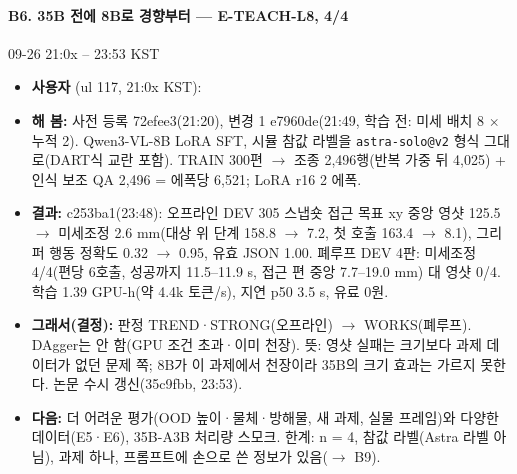 \paragraph{B6. 35B 전에 8B로 경향부터 --- E-TEACH-L8, 4/4}
{\small 09-26 21:0x -- 23:53 KST}
\begin{itemize}
  \item \textbf{사용자} (ul 117, 21:0x KST): 
  \item \textbf{해 봄:} 사전 등록 72efee3(21:20), 변경 1 e7960de(21:49, 학습 전: 미세 배치 8 $\times$ 누적 2). Qwen3-VL-8B LoRA SFT, 시뮬 참값 라벨을 \texttt{astra-\allowbreak{}solo@v2} 형식 그대로(DART식 교란 포함). TRAIN 300편 $\rightarrow$ 조종 2,496행(반복 가중 뒤 4,025) + 인식 보조 QA 2,496 = 에폭당 6,521; LoRA r16 2 에폭.
  \item \textbf{결과:} c253ba1(23:48): 오프라인 DEV 305 스냅숏 접근 목표 xy 중앙 영샷 125.5 $\rightarrow$ 미세조정 2.6 mm(대상 위 단계 158.8 $\rightarrow$ 7.2, 첫 호출 163.4 $\rightarrow$ 8.1), 그리퍼 행동 정확도 0.32 $\rightarrow$ 0.95, 유효 JSON 1.00. 폐루프 DEV 4판: 미세조정 4/4(편당 6호출, 성공까지 11.5--11.9 s, 접근 편 중앙 7.7--19.0 mm) 대 영샷 0/4. 학습 1.39 GPU-h(약 4.4k 토큰/s), 지연 p50 3.5 s, 유료 0원.
  \item \textbf{그래서(결정):} 판정 TREND·STRONG(오프라인) $\rightarrow$ WORKS(폐루프). DAgger는 안 함(GPU 조건 초과·이미 천장). 뜻: 영샷 실패는 크기보다 과제 데이터가 없던 문제 쪽; 8B가 이 과제에서 천장이라 35B의 크기 효과는 가르지 못한다. 논문 수시 갱신(35c9fbb, 23:53).
  \item \textbf{다음:} 더 어려운 평가(OOD 높이·물체·방해물, 새 과제, 실물 프레임)와 다양한 데이터(E5·E6), 35B-A3B 처리량 스모크. 한계: n = 4, 참값 라벨(Astra 라벨 아님), 과제 하나, 프롬프트에 손으로 쓴 정보가 있음($\rightarrow$ B9).
\end{itemize}

